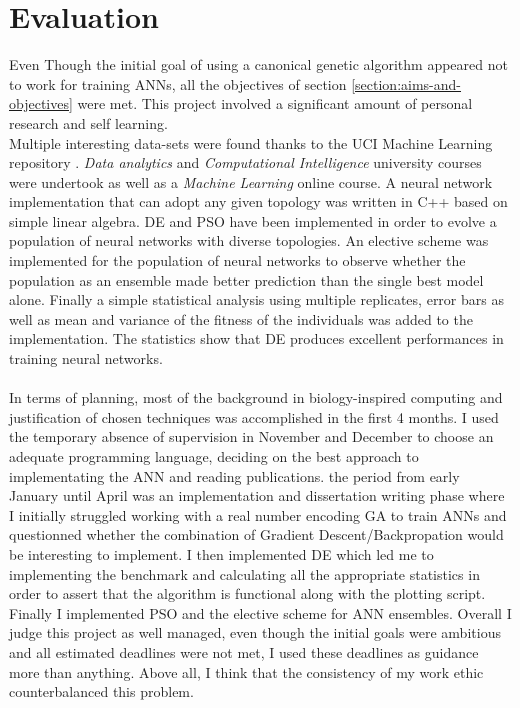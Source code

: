 \documentclass[a4paper,12pt, oneside]{memoir}
\begin{document}
\clearpage

\chapter{Evaluation}

Even Though the initial goal of using a canonical genetic algorithm appeared not to work for training ANNs, all the objectives of section \ref{section:aims-and-objectives} were met. This project involved a significant amount of personal research and self learning.\\

Multiple interesting data-sets were found thanks to the UCI Machine Learning repository \cite{uci-machine-learning-repo-2013}. \textit{Data analytics} and \textit{Computational Intelligence} university courses were undertook as well as a \textit{Machine Learning} online course. A neural network implementation that can adopt any given topology was written in C++ based on simple linear algebra. DE and PSO have been implemented in order to evolve a population of neural networks with diverse topologies. An elective scheme was implemented for the population of neural networks to observe whether the population as an ensemble made better prediction than the single best model alone. Finally a simple statistical analysis using multiple replicates, error bars as well as mean and variance of the fitness of the individuals was added to the implementation. The statistics show that DE produces excellent performances in training neural networks.
\\ \\
In terms of planning, most of the background in biology-inspired computing and justification of chosen techniques was accomplished in the first 4 months. I used the temporary absence of supervision in November and December to choose an adequate programming language, deciding on the best approach to implementating the ANN and reading publications. the period from early January until April was an implementation and dissertation writing phase where I initially struggled working with a real number encoding GA to train ANNs and questionned whether the combination of Gradient Descent/Backpropation would be interesting to implement. I then implemented DE which led me to implementing the benchmark and calculating all the appropriate statistics in order to assert that the algorithm is functional along with the plotting script. Finally I implemented PSO and the elective scheme for ANN ensembles. Overall I judge this project as well managed, even though the initial goals were ambitious and all estimated deadlines were not met, I used these deadlines as guidance more than anything. Above all, I think that the consistency of my work ethic counterbalanced this problem.
\end{document}
